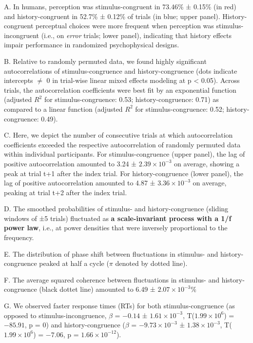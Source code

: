 \documentclass[
]{article}
\begin{document}
A. In humans, perception was stimulus-congruent in 73.46\% ± 0.15\% (in
red) and history-congruent in 52.7\% ± 0.12\% of trials (in blue; upper
panel). History-congruent perceptual choices were more frequent when
perception was stimulus-incongruent (i.e., on \emph{error} trials; lower
panel), indicating that history effects impair performance in randomized
psychophysical designs.

B. Relative to randomly permuted data, we found highly significant
autocorrelations of stimulus-congruence and history-congruence (dots
indicate intercepts \(\neq\) 0 in trial-wise linear mixed effects
modeling at p \textless{} 0.05). Across trials, the autocorrelation
coefficients were best fit by an exponential function (adjusted \(R^2\)
for stimulus-congruence: 0.53; history-congruence: 0.71) as compared to
a linear function (adjusted \(R^2\) for stimulus-congruence: 0.52;
history-congruence: 0.49).

C. Here, we depict the number of consecutive trials at which
autocorrelation coefficients exceeded the respective autocorrelation of
randomly permuted data within individual participants. For
stimulus-congruence (upper panel), the lag of positive autocorrelation
amounted to 3.24 ± \ensuremath{2.39\times 10^{-3}} on average, showing a
peak at trial t+1 after the index trial. For history-congruence (lower
panel), the lag of positive autocorrelation amounted to 4.87 ±
\ensuremath{3.36\times 10^{-3}} on average, peaking at trial t+2 after
the index trial.

D. The smoothed probabilities of stimulus- and history-congruence
(sliding windows of ±5 trials) fluctuated as \textbf{a scale-invariant
process with a 1/f power law}, i.e., at power densities that were
inversely proportional to the frequency.

E. The distribution of phase shift between fluctuations in stimulus- and
history-congruence peaked at half a cycle (\(\pi\) denoted by dotted
line).

F. The average squared coherence between fluctuations in stimulus- and
history-congruence (black dottet line) amounted to 6.49 ±
\ensuremath{2.07\times 10^{-3}}\%

G. We observed faster response times (RTs) for both stimulus-congruence
(as opposed to stimulus-incongruence, \(\beta\) = \(-0.14\) ±
\(\ensuremath{1.61\times 10^{-3}}\),
T(\(\ensuremath{1.99\times 10^{6}}\)) = \(-85.91\), p = \(0\)) and
history-congruence (\(\beta\) = \(\ensuremath{-9.73\times 10^{-3}}\) ±
\(\ensuremath{1.38\times 10^{-3}}\),
T(\(\ensuremath{1.99\times 10^{6}}\)) = \(-7.06\), p =
\(\ensuremath{1.66\times 10^{-12}}\)).
\end{document}

